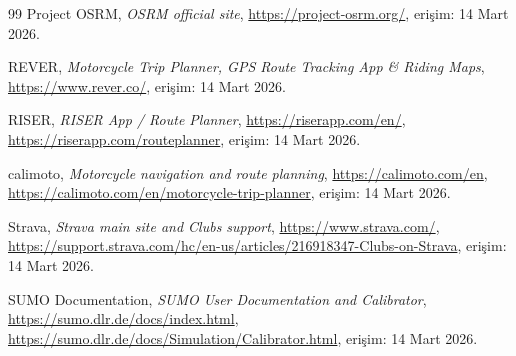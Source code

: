 \documentclass[11pt,a4paper]{article}
\begin{document}
\begin{thebibliography}{99}
Project OSRM, \emph{OSRM official site}, \url{https://project-osrm.org/}, erişim: 14 Mart 2026.

REVER, \emph{Motorcycle Trip Planner, GPS Route Tracking App \& Riding Maps}, \url{https://www.rever.co/}, erişim: 14 Mart 2026.

RISER, \emph{RISER App / Route Planner}, \url{https://riserapp.com/en/}, \url{https://riserapp.com/routeplanner}, erişim: 14 Mart 2026.

calimoto, \emph{Motorcycle navigation and route planning}, \url{https://calimoto.com/en}, \url{https://calimoto.com/en/motorcycle-trip-planner}, erişim: 14 Mart 2026.

Strava, \emph{Strava main site and Clubs support}, \url{https://www.strava.com/}, \url{https://support.strava.com/hc/en-us/articles/216918347-Clubs-on-Strava}, erişim: 14 Mart 2026.

SUMO Documentation, \emph{SUMO User Documentation and Calibrator}, \url{https://sumo.dlr.de/docs/index.html}, \url{https://sumo.dlr.de/docs/Simulation/Calibrator.html}, erişim: 14 Mart 2026.

\end{thebibliography}
\end{document}
